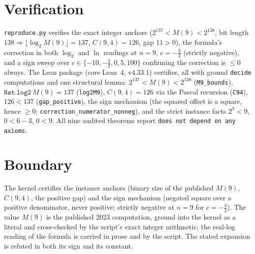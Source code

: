 \documentclass[11pt]{article}
\begin{document}
\section{Verification}

\texttt{reproduce.py} verifies the exact integer anchors
($2^{137} < M(9) < 2^{138}$, bit length $138 \Rightarrow
\lfloor\log_2 M(9)\rfloor = 137$, $C(9,4) = 126$, gap $11 > 0$), the
formula's correction in both $\log_2$ and $\ln$ readings at
$n = 9$, $c = -\tfrac32$ (strictly negative), and a sign sweep over
$c \in \{-10, -\tfrac32, 0, 5, 100\}$ confirming the correction is
$\le 0$ always.  The Lean package (core Lean~4, v4.33.1) certifies,
all with ground \texttt{decide} computations and one structural
lemma: $2^{137} < M(9) < 2^{138}$ (\texttt{M9\_bounds}),
$\texttt{Nat.log2}\,M(9) = 137$ (\texttt{log2M9}), $C(9,4) = 126$ via
the Pascal recursion (\texttt{C94}), $126 < 137$
(\texttt{gap\_positive}), the sign mechanism (the squared offset is a
square, hence $\ge 0$; \texttt{correction\_numerator\_nonneg}), and
the strict instance facts $2^3 < 9$, $0 < 6 - 3$,
$0 < 9$.  All nine audited theorems report \texttt{does not depend on
any axioms}.

\section{Boundary}

The kernel certifies the instance anchors (binary size of the
published $M(9)$, $C(9,4)$, the positive gap) and the sign mechanism
(negated square over a positive denominator, never positive; strictly
negative at $n = 9$ for $c = -\tfrac32$).  The value $M(9)$ is the
published 2023 computation, ground into the kernel as a literal and
cross-checked by the script's exact integer arithmetic; the real-log
reading of the formula is carried in prose and by the script.  The
stated expansion is refuted in both its sign and its constant.
\end{document}

